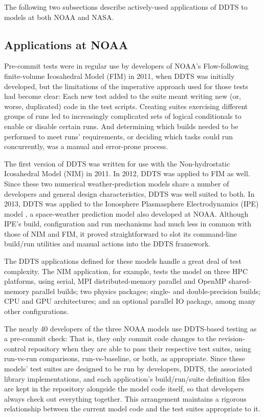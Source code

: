 \documentclass[conference]{IEEEtran}
\begin{document}
The following two subsections describe actively-used applications of DDTS to models at both NOAA and NASA.

\subsection{Applications at NOAA}

Pre-commit tests were in regular use by developers of NOAA's Flow-following finite-volume Icosahedral Model (FIM) \cite{fim} in 2011, when DDTS was initially developed, but the limitations of the imperative approach used for those tests had become clear: Each new test added to the suite meant writing new (or, worse, duplicated) code in the test scripts. Creating suites exercising different groups of runs led to increasingly complicated sets of logical conditionals to enable or disable certain runs. And determining which builds needed to be performed to meet runs' requirements, or deciding which tasks could run concurrently, was a manual and error-prone process.

The first version of DDTS was written for use with the Non-hydrostatic Icosahedral Model (NIM) \cite{nim} in 2011. In 2012, DDTS was applied to FIM as well. Since these two numerical weather-prediction models share a number of developers and general design characteristics, DDTS was well suited to both. In 2013, DDTS was applied to the Ionosphere Plasmasphere Electrodynamics (IPE) model \cite{ipe}, a space-weather prediction model also developed at NOAA. Although IPE's build, configuration and run mechanisms had much less in common with those of NIM and FIM, it proved straightforward to slot its command-line build/run utilities and manual actions into the DDTS framework.

The DDTS applications defined for these models handle a great deal of test complexity. The NIM application, for example, tests the model on three HPC platforms, using serial, MPI distributed-memory parallel and OpenMP shared-memory parallel builds; two physics packages; single- and double-precision builds; CPU and GPU architectures; and an optional parallel IO package, among many other configurations.

The nearly 40 developers of the three NOAA models use DDTS-based testing as a pre-commit check: That is, they only commit code changes to the revision-control repository when they are able to pass their respective test suites, using run-vs-run comparisons, run-vs-baseline, or both, as appropriate. Since these models' test suites are designed to be run by developers, DDTS, the associated library implementations, and each application's build/run/suite definition files are kept in the repository alongside the model code itself, so that developers always check out everything together. This arrangement maintains a rigorous relationship between the current model code and the test suites appropriate to it.
\end{document}
